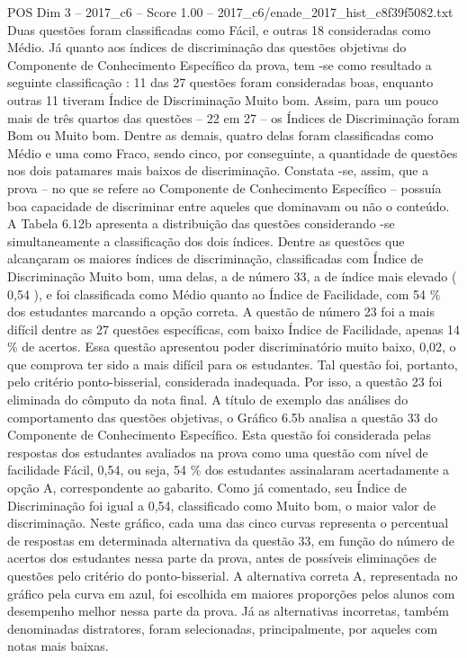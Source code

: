 \begin{textsample}{POS Dim 3 – 2017\_c6 – Score 1.00 – 2017\_c6/enade\_2017\_hist\_c8f39f5082.txt}
Duas questões foram classificadas como Fácil, e outras 18 consideradas como Médio.
Já quanto aos índices de discriminação das questões objetivas do Componente de Conhecimento Específico da prova, tem -se como resultado a seguinte classificação : 11 das 27 questões foram consideradas boas, enquanto outras 11 tiveram Índice de Discriminação Muito bom.
Assim, para um pouco mais de três quartos das questões – 22 em 27 – os Índices de Discriminação foram Bom ou Muito bom.
Dentre as demais, quatro delas foram classificadas como Médio e uma como Fraco, sendo cinco, por conseguinte, a quantidade de questões nos dois patamares mais baixos de discriminação.
Constata -se, assim, que a prova – no que se refere ao Componente de Conhecimento Específico – possuía boa capacidade de discriminar entre aqueles que dominavam ou não o conteúdo.
A Tabela 6.12b apresenta a distribuição das questões considerando -se simultaneamente a classificação dos dois índices.
Dentre as questões que alcançaram os maiores índices de discriminação, classificadas com Índice de Discriminação Muito bom, uma delas, a de número 33, a de índice mais elevado ( 0,54 ), e foi classificada como Médio quanto ao Índice de Facilidade, com 54 \% dos estudantes marcando a opção correta.
A questão de número 23 foi a mais difícil dentre as 27 questões específicas, com baixo Índice de Facilidade, apenas 14 \% de acertos.
Essa questão apresentou poder discriminatório muito baixo, 0,02, o que comprova ter sido a mais difícil para os estudantes.
Tal questão foi, portanto, pelo critério ponto-bisserial, considerada inadequada.
Por isso, a questão 23 foi eliminada do cômputo da nota final.
A título de exemplo das análises do comportamento das questões objetivas, o Gráfico 6.5b analisa a questão 33 do Componente de Conhecimento Específico.
Esta questão foi considerada pelas respostas dos estudantes avaliados na prova como uma questão com nível de facilidade Fácil, 0,54, ou seja, 54 \% dos estudantes assinalaram acertadamente a opção A, correspondente ao gabarito.
Como já comentado, seu Índice de Discriminação foi igual a 0,54, classificado como Muito bom, o maior valor de discriminação.
Neste gráfico, cada uma das cinco curvas representa o percentual de respostas em determinada alternativa da questão 33, em função do número de acertos dos estudantes nessa parte da prova, antes de possíveis eliminações de questões pelo critério do ponto-bisserial.
A alternativa correta A, representada no gráfico pela curva em azul, foi escolhida em maiores proporções pelos alunos com desempenho melhor nessa parte da prova.
Já as alternativas incorretas, também denominadas distratores, foram selecionadas, principalmente, por aqueles com notas mais baixas.

\end{textsample}
